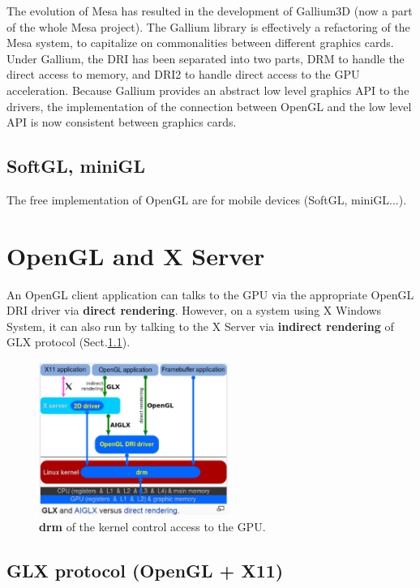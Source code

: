 The evolution of Mesa has resulted in the development of Gallium3D (now a part
of the whole Mesa project). The Gallium library is effectively a refactoring of
the Mesa system, to capitalize on commonalities between different graphics
cards. Under Gallium, the DRI has been separated into two parts, DRM to handle
the direct access to memory, and DRI2 to handle direct access to the GPU
acceleration. Because Gallium provides an abstract low level graphics API to the
drivers, the implementation of the connection between OpenGL and the low level
API is now consistent between graphics cards.


\subsection{SoftGL, miniGL}

The free implementation of OpenGL are for mobile devices (SoftGL,
miniGL...).


\section{OpenGL and X Server}

An OpenGL client application can talks to the GPU via the appropriate OpenGL DRI
driver via {\bf direct rendering}. However, on a system using X Windows System,
it can also run by talking to the X Server via {\bf indirect rendering} of GLX
protocol (Sect.\ref{sec:GLX}).

\begin{figure}[hbt]
  \centerline{\includegraphics[height=5cm,
    angle=0]{./images/OpenGL_Xserver.eps}}
\caption{{\bf drm} of the kernel control access to the GPU.}
\label{fig:OpenGL_Xserver}
\end{figure}

\subsection{GLX protocol (OpenGL + X11)}
\label{sec:GLX}

